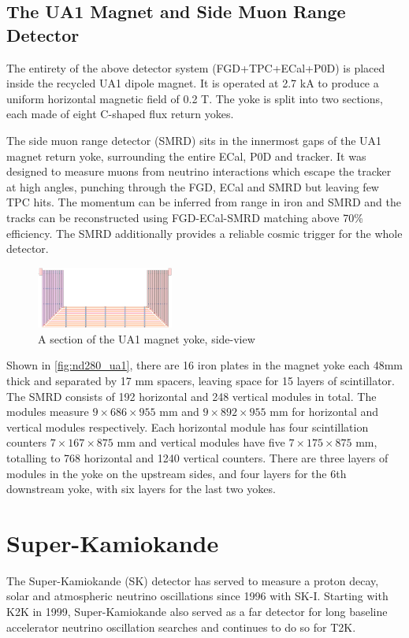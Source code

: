 \subsection{The UA1 Magnet and Side Muon Range Detector}
The entirety of the above detector system (FGD+TPC+ECal+P0D) is placed inside the recycled UA1 dipole magnet. It is operated at 2.7 kA to produce a uniform horizontal magnetic field of 0.2 T. The  yoke is split into two sections, each made of eight C-shaped flux return yokes. 

The side muon range detector (SMRD)\cite{t2k_smrd} sits in the innermost gaps of the UA1 magnet return yoke, surrounding the entire ECal, P0D and tracker. It was designed to measure muons from neutrino interactions which escape the tracker at high angles, punching through the FGD, ECal and SMRD but leaving few TPC hits. The momentum can be inferred from range in iron and SMRD and the tracks can be reconstructed using FGD-ECal-SMRD matching above 70\% efficiency. The SMRD additionally provides a reliable cosmic trigger for the whole detector. 
\begin{figure}[h]
	\includegraphics[width=0.4\textwidth, trim={0mm 0mm 0mm 0mm}, clip,page=1]{figures/det_chap/smrd/ua1_smrd}
	\caption{A section of the UA1 magnet yoke, side-view}
	\label{fig:nd280_ua1}
\end{figure}

Shown in \autoref{fig:nd280_ua1}, there are 16 iron plates in the magnet yoke each 48mm thick and separated by 17 mm spacers, leaving space for 15 layers of scintillator. The SMRD consists of 192 horizontal and 248 vertical modules in total. The modules measure $9\times686\times955\text{ mm}$ and $9\times892\times955\text{ mm}$ for horizontal and vertical modules respectively. Each horizontal module has four scintillation counters $7\times167\times875\text{ mm}$ and vertical modules have five $7\times175\times875\text{ mm}$, totalling to 768 horizontal and 1240 vertical counters. There are three layers of modules in the yoke on the upstream sides, and four layers for the 6th downstream yoke, with six layers for the last two yokes.

\section{Super-Kamiokande}
\label{sec:sk}
The Super-Kamiokande (SK)\cite{t2k_sk, t2k_sk2, t2k_sk3} detector has served to measure a proton decay, solar and atmospheric neutrino oscillations since 1996 with SK-I. Starting with K2K\cite{k2k_design} in 1999, Super-Kamiokande also served as a far detector for long baseline accelerator neutrino oscillation searches and continues to do so for T2K. 

